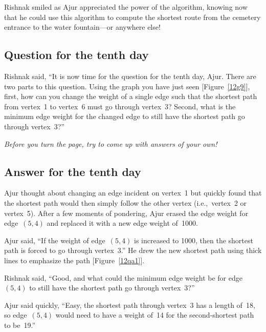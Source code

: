 Rishnak smiled as Ajur appreciated the power of the algorithm, knowing now that he could use this algorithm to compute the shortest route from the cemetery entrance to the water fountain---or anywhere else!

\subsection*{Question for the tenth day}
Rishnak said, ``It is now time for the question for the tenth day, Ajur. There are two parts to this question. Using the graph you have just seen [Figure~\ref{12g9}], first, how can you change the weight of a single edge such that the shortest path from vertex~1 to vertex~6 must go through vertex~3? Second, what is the minimum edge weight for the changed edge to still have the shortest path go through vertex~3?''

\textit{Before you turn the page, try to come up with answers of your own!}

\newpage
\subsection*{Answer for the tenth day}
Ajur thought about changing an edge incident on vertex~1 but quickly found that the shortest path would then simply follow the other vertex (i.e.,~vertex~2 or vertex~5).
After a few moments of pondering, Ajur erased the edge weight for edge~$(5,4)$ and replaced it with a new edge weight of~1000.

Ajur said, ``If the weight of edge~$(5,4)$ is increased to 1000, then the shortest path is forced to go through vertex~3.'' He drew the new shortest path using thick lines to emphasize the path [Figure~\ref{12qa1}].

Rishnak said, ``Good, and what could the minimum edge weight be for edge~$(5,4)$ to still have the shortest path go through vertex~3?''

Ajur said quickly, ``Easy, the shortest path through vertex~3 has a length of~18, so edge~$(5,4)$ would need to have a weight of~14 for the second-shortest path to be~19.''


